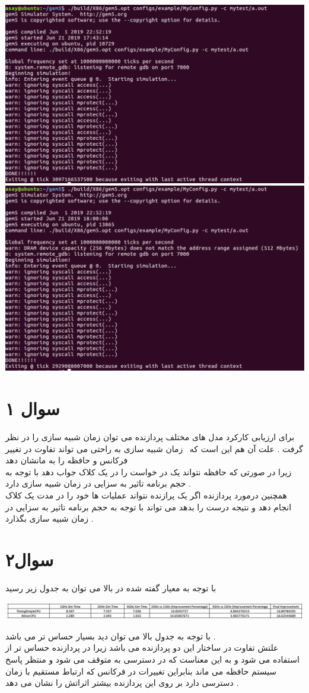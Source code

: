 \documentclass{article}
\begin{document}
\begin{center}
			\includegraphics[width=.5\linewidth]{11thConfigSim} 
			\includegraphics[width=.5\linewidth]{12thConfigSim} 


\end{center}
\section*{سوال ۱ }
برای ارزیابی کارکرد مدل های مختلف پردازنده می توان زمان شبیه سازی
 را در نظر گرفت . 
علت آن هم این است که  زمان شبیه سازی  به راحتی می تواند تفاوت در تغییر فرکانس و حافظه را به مانشان دهد \\
زیرا در صورتی که حافظه نتواند یک در خواست را در یک کلاک جواب دهد با توجه به حجم برنامه تاثیر به سزایی در زمان شبیه سازی  دارد . \\
همچنین درمورد پردازنده اگر یک پرازنده نتواند عملیات ها خود را در مدت یک کلاک انجام دهد و نتیجه درست را بدهد می تواند با توجه به حجم برنامه تاثیر به سزایی در زمان شبیه سازی  بگذارد . 
\section*{سوال۲ }
با توجه به معیار گفته شده در بالا می توان به جدول زیر رسید 
\begin{center}
				\includegraphics[width=1\linewidth]{q2p1} 
\end{center}
با توجه به جدول بالا می توان دید
\lr{\textcolor{red}{TimingSimpleCPU}}
بسیار حساس تر می باشد . \\
علتش تفاوت در ساختار این دو پردازنده می باشد زیرا در پردازنده حساس تر از
استفاده می شود و به این معناست که  در دسترسی به 
متوقف می شود و منتظر پاسخ سیستم حافظه می ماند بنابراین تغییرات در فرکانس که ارتباط مستقیم با زمان دسترسی دارد بر روی این پردازنده بیشتر اثراتش را نشان می دهد . 
\end{document}
